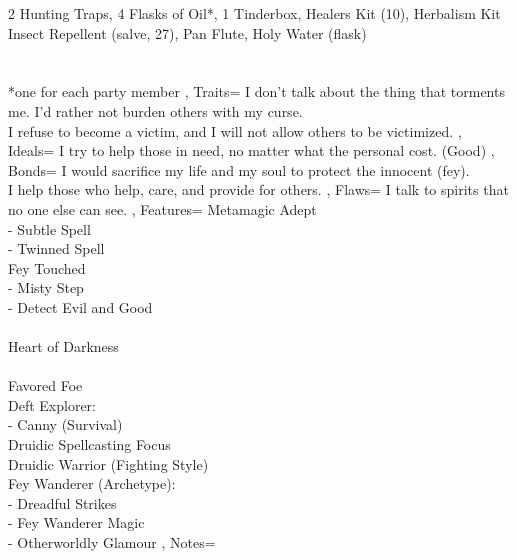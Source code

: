 \documentclass[10pt,a4paper]{scrbook}
\begin{document}
{{			2 Hunting Traps, 4 Flasks of Oil*, 1 Tinderbox, Healers Kit (10), Herbalism Kit\\
			Insect Repellent (salve, 27), Pan Flute, Holy Water (flask)\\
			\\
			\\
			*one for each party member
		},
		Traits={\tiny
			I don't talk about the thing that torments me. I'd rather not burden others with my curse.\\
			I refuse to become a victim, and I will not allow others to be victimized.
		},
		Ideals={
			I try to help those in need, no matter what the personal cost. (Good)
		},
		Bonds={
			\tiny
			I would sacrifice my life and my soul to protect the innocent (fey).\\
			I help those who help, care, and provide for others.
		},
		Flaws={
			I talk to spirits that no one else can see.
		},
		Features={
			Metamagic Adept\\
			- Subtle Spell\\
			- Twinned Spell\\
			Fey Touched\\
			- Misty Step\\
			- Detect Evil and Good\\
			\\
			Heart of Darkness\\
			\\
			Favored Foe\\ %
			Deft Explorer:\\ %
			- Canny (Survival)\\
			Druidic Spellcasting Focus\\
			Druidic Warrior (Fighting Style)\\
			Fey Wanderer (Archetype):\\
			- Dreadful Strikes\\
			- Fey Wanderer Magic\\
			- Otherworldly Glamour
		},
		Notes={
		}
	}
\end{document}
